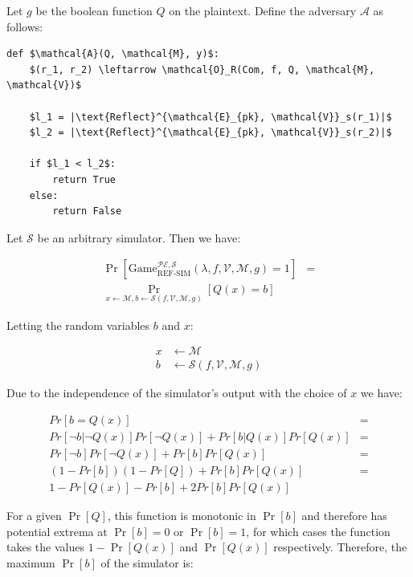 \documentclass[conference, letterpaper, 10pt]{IEEEtran}
\begin{document}
\begin{IEEEproof}

Let $g$ be the boolean function $Q$ on the plaintext. Define the adversary
$\mathcal{A}$ as follows:

\begin{lstlisting}[texcl,mathescape]
def $\mathcal{A}(Q, \mathcal{M}, y)$:
    $(r_1, r_2) \leftarrow \mathcal{O}_R(Com, f, Q, \mathcal{M}, \mathcal{V})$

    $l_1 = |\text{Reflect}^{\mathcal{E}_{pk}, \mathcal{V}}_s(r_1)|$
    $l_2 = |\text{Reflect}^{\mathcal{E}_{pk}, \mathcal{V}}_s(r_2)|$

    if $l_1 < l_2$:
        return True
    else:
        return False
\end{lstlisting}

Let $\mathcal{S}$ be an arbitrary simulator. Then we have:

\begin{align*}
    \Pr[\text{Game}_{\text{REF-SIM}}^{\mathcal{PE},\mathcal{S}}
        (\lambda, f, \mathcal{V}, \mathcal{M}, g) = 1] &=\\
    \Pr_{x \leftarrow \mathcal{M}, b \leftarrow \mathcal{S}(f, \mathcal{V}, \mathcal{M}, g)}
        [Q(x) = b]
\end{align*}

Letting the random variables $b$ and $x$:

\begin{align*}
    x &\leftarrow \mathcal{M}\\
    b &\leftarrow \mathcal{S}(f, \mathcal{V}, \mathcal{M}, g)
\end{align*}

Due to the independence of the simulator's output with the choice of $x$ we have:

\begin{align*}
    Pr[b = Q(x)] &=\\
    Pr[\lnot b|\lnot Q(x)]Pr[\lnot Q(x)] + Pr[b|Q(x)]Pr[Q(x)] &=\\
    Pr[\lnot b]Pr[\lnot Q(x)] + Pr[b]Pr[Q(x)] &=\\
    (1 - Pr[b])(1 - Pr[Q]) + Pr[b]Pr[Q(x)] &=\\
    1 - Pr[Q(x)] - Pr[b] + 2Pr[b]Pr[Q(x)]
\end{align*}

For a given $\Pr[Q]$, this function is monotonic in $\Pr[b]$ and therefore has
potential extrema at $\Pr[b] = 0$ or $\Pr[b] = 1$, for which cases the function
takes the values $1 - \Pr[Q(x)]$ and $\Pr[Q(x)]$ respectively. Therefore, the
maximum $\Pr[b]$ of the simulator is:


\end{IEEEproof}
\end{document}
